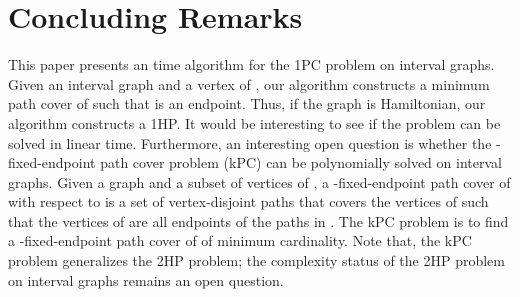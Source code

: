 \documentclass[10pt]{article}
\begin{document}
{\vskip 0.3in \section{Concluding Remarks}

This paper presents an  time algorithm for the 1PC problem
on interval graphs. Given an interval graph  and a vertex 
of , our algorithm constructs a minimum path cover of  such
that  is an endpoint. Thus, if the graph  is Hamiltonian,
our algorithm constructs a 1HP. It would be interesting to see if
the problem can be solved in linear time. Furthermore, an
interesting open question is whether the -fixed-endpoint path
cover problem (kPC) can be polynomially solved on interval graphs.
Given a graph  and a subset  of  vertices of
, a -fixed-endpoint path cover of  with respect to
 is a set of vertex-disjoint paths  that
covers the vertices of  such that the  vertices of
 are all endpoints of the paths in . The
kPC problem is to find a -fixed-endpoint path cover of  of
minimum cardinality. Note that, the kPC problem generalizes the
2HP problem; the complexity status of the 2HP problem on interval
graphs remains an open question. }


 \frenchspacing \vskip 0.4in
\end{document}
